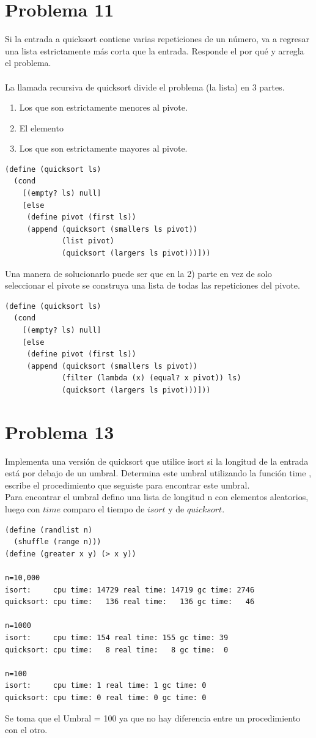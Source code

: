 \documentclass[a4paper,11pt]{article}
\theoremstyle{mytheor}
\begin{document}
\newpage
\section*{Problema 11}
Si la entrada a quicksort contiene varias repeticiones de un número, va a regresar
una lista estrictamente más corta que la entrada. Responde el por qué y arregla el problema. \\ \\

La llamada recursiva de quicksort divide el problema (la lista) en 3 partes.
\begin{enumerate}
\item Los que son estrictamente menores al pivote.
\item El elemento
\item Los que son estrictamente mayores al pivote.
\end{enumerate}
\begin{lstlisting}[title=quicksort]
(define (quicksort ls)
  (cond
    [(empty? ls) null]
    [else
     (define pivot (first ls))
     (append (quicksort (smallers ls pivot))
             (list pivot)
             (quicksort (largers ls pivot)))]))
\end{lstlisting}

Una manera de solucionarlo puede ser que en la 2) parte en vez de solo seleccionar el pivote se construya una lista de todas las repeticiones del pivote.
\begin{lstlisting}[title=quicksort]
(define (quicksort ls)
  (cond
    [(empty? ls) null]
    [else
     (define pivot (first ls))
     (append (quicksort (smallers ls pivot))
             (filter (lambda (x) (equal? x pivot)) ls)
             (quicksort (largers ls pivot)))]))
\end{lstlisting}
\newpage
\section*{Problema 13}
Implementa una versión de quicksort que utilice isort si la longitud de la entrada está
por debajo de un umbral. Determina este umbral utilizando la función time , escribe el procedimiento
que seguiste para encontrar este umbral. \\

Para encontrar el umbral defino una lista de longitud n con elementos aleatorios, luego con $time$ comparo el tiempo de $isort$ y de $quicksort$.
\begin{lstlisting}[title= timing quicksort and isort]
(define (randlist n)
  (shuffle (range n)))
(define (greater x y) (> x y))

n=10,000
isort:     cpu time: 14729 real time: 14719 gc time: 2746
quicksort: cpu time:   136 real time:   136 gc time:   46

n=1000
isort:     cpu time: 154 real time: 155 gc time: 39
quicksort: cpu time:   8 real time:   8 gc time:  0

n=100
isort:     cpu time: 1 real time: 1 gc time: 0
quicksort: cpu time: 0 real time: 0 gc time: 0

\end{lstlisting}
Se toma que el Umbral = 100 ya que no hay diferencia entre un procedimiento con el otro.
\newpage
\end{document}
